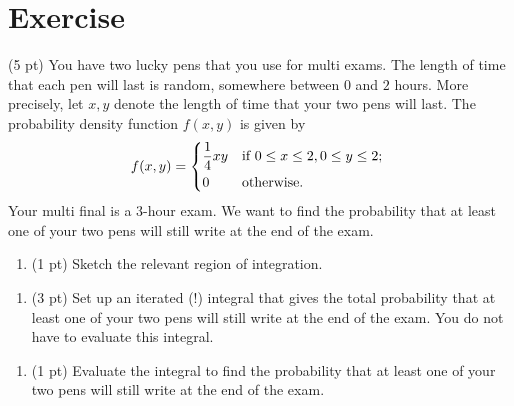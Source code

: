 \section{Exercise}

(5 pt) You have two lucky pens that you use for multi exams. The length of time that each pen will last is random, somewhere between $0$ and $2$ hours. More precisely, let $x,y$ denote the length of time that your two pens will last. The probability density function $f(x,y)$ is given by
\begin{align*}
f(x,y)
=
\begin{dcases*}
\frac{1}{4} x y 	&	if $0 \leq x \leq 2,0 \leq y \leq 2$;	\\
0			&	otherwise.
\end{dcases*}
\end{align*}
Your multi final is a $3$-hour exam. We want to find the probability that at least one of your two pens will still write at the end of the exam.
\begin{enumerate}[label=(\alph*)]
\item (1 pt) Sketch the relevant region of integration.
\end{enumerate}

\spaceSolution{1.5in}{}



\begin{enumerate}[resume,label=(\alph*)]
\item (3 pt) Set up an iterated (!) integral that gives the total probability that at least one of your two pens will still write at the end of the exam. You do not have to evaluate this integral.
\end{enumerate}

\spaceSolution{1.5in}{}



\begin{enumerate}[label=(\alph*)]
\item (1 pt) Evaluate the integral to find the probability that at least one of your two pens will still write at the end of the exam.
\end{enumerate}

\spaceSolution{1in}{}